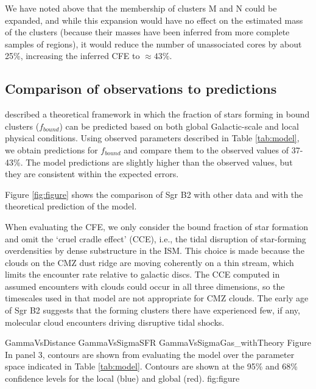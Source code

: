 \documentclass[twocolumn]{aastex61}
\begin{document}
We have noted above that the membership of clusters M and N could be expanded,
and while this expansion would have no effect on the estimated mass of the clusters
(because their masses have been inferred from more complete samples of \hii regions),
it would reduce the number of unassociated cores by about 25\%, increasing the inferred
CFE to $\approx43\%$. %

\subsection{Comparison of observations to predictions}
\citet{Kruijssen2012a} described a theoretical framework in which the fraction
of stars forming in bound clusters ($f_{bound}$) can be predicted based on both
global Galactic-scale and local physical conditions.  Using observed parameters
described in Table \ref{tab:model}, we obtain predictions for $f_{bound}$ and
compare them to the observed values of 37-43\%.  The model predictions are
slightly higher than the observed values, but they are consistent within the expected
errors.

Figure \ref{fig:figure} shows the comparison of Sgr B2 with other data and with
the theoretical prediction of the \citet{Kruijssen2012a} model.

When evaluating the CFE, we only consider the bound fraction of star formation
and omit the `cruel cradle effect' (CCE), i.e., the tidal disruption of
star-forming overdensities by dense substructure in the ISM. This choice is
made because the clouds on the CMZ dust ridge are moving coherently on a thin
stream, which limits the encounter rate relative to galactic discs.  The CCE
computed in \citet{Kruijssen2012a} assumed encounters with clouds could occur
in all three dimensions, so the timescales used in that model are not
appropriate for CMZ clouds.  The early age of Sgr B2 suggests that the forming
clusters there have experienced few, if any, molecular cloud encounters driving
disruptive tidal shocks.

\FigureThreePDF
{GammaVsDistance}
{GammaVsSigmaSFR}
{GammaVsSigmaGas_withTheory}
{Figure
In panel 3, contours are shown from evaluating the \citet{Kruijssen2012a} model
over the parameter space indicated in Table \ref{tab:model}.  Contours are shown
at the 95\% and 68\% confidence levels for the local (blue) and global (red).
}
{fig:figure}





\end{document}
